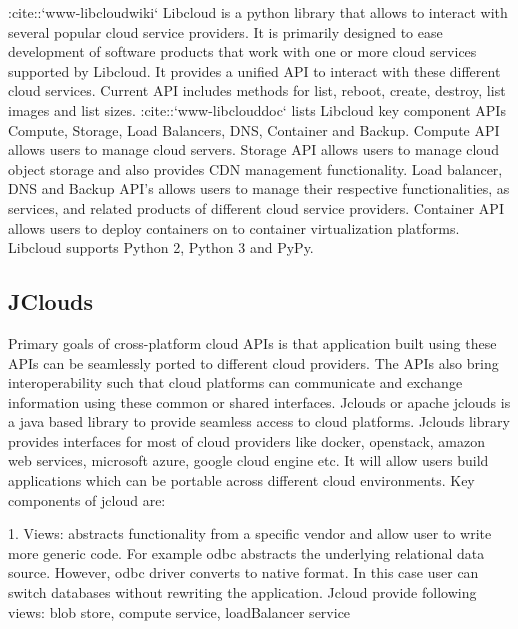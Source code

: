     :cite::`www-libcloudwiki` Libcloud is a python library that
     allows to interact with several popular cloud service
     providers. It is primarily designed to ease development of
     software products that work with one or more cloud services
     supported by Libcloud. It provides a unified API to interact with
     these different cloud services. Current API includes methods for
     list, reboot, create, destroy, list images and list
     sizes. :cite::`www-libclouddoc` lists Libcloud key component APIs
     Compute, Storage, Load Balancers, DNS, Container and
     Backup. Compute API allows users to manage cloud servers. Storage
     API allows users to manage cloud object storage and also provides
     CDN management functionality. Load balancer, DNS and Backup API’s
     allows users to manage their respective functionalities, as
     services, and related products of different cloud service
     providers. Container API allows users to deploy containers on to
     container virtualization platforms. Libcloud supports Python 2,
     Python 3 and PyPy.
     
\subsection{ JClouds}

     \cite{cloud-portability-book} Primary goals of cross-platform
     cloud APIs is that application built using these APIs can be
     seamlessly ported to different cloud providers. The APIs also
     bring interoperability such that cloud platforms can communicate
     and exchange information using these common or shared interfaces.
     Jclouds or apache jclouds \cite{www-jclouds} is a java based
     library to provide seamless access to cloud platforms. Jclouds
     library provides interfaces for most of cloud providers like
     docker, openstack, amazon web services, microsoft azure, google
     cloud engine etc. It will allow users build applications which
     can be portable across different cloud environments.  Key
     components of jcloud are:

     1. Views: abstracts functionality from a specific vendor and
        allow user to write more generic code. For example odbc
        abstracts the underlying relational data source. However, odbc
        driver converts to native format. In this case user can switch
        databases without rewriting the application. Jcloud provide
        following views: blob store, compute service, loadBalancer
        service

